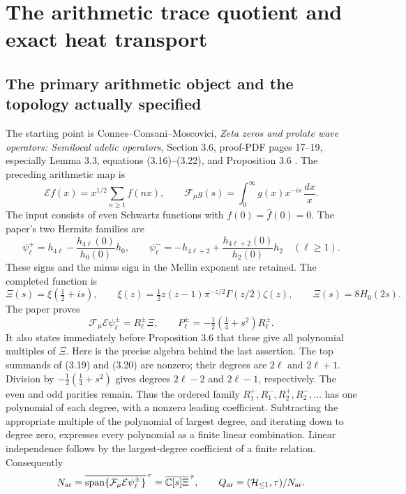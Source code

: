 \section{The arithmetic trace quotient and exact heat transport}
\label{sec:connes-complete-transport}

\subsection{The primary arithmetic object and the topology actually specified}
\label{sec:cq-source}
The starting point is Connes--Consani--Moscovici,
\emph{Zeta zeros and prolate wave operators: Semilocal adelic operators},
Section 3.6, proof-PDF pages 17--19, especially Lemma 3.3,
equations (3.16)--(3.22), and Proposition 3.6
\cite{ccmProlate2024}. The preceding arithmetic map is
\[
 \mathcal E f(x)=x^{1/2}\sum_{n\geq1}f(nx),\qquad
 \mathcal F_\mu g(s)=\int_0^\infty g(x)x^{-is}\,\frac{dx}{x}.
\]
The input consists of even Schwartz functions with
$f(0)=\widehat f(0)=0$. The paper's two Hermite families are
\[
 \psi_\ell^+=h_{4\ell}-\frac{h_{4\ell}(0)}{h_0(0)}h_0,
 \qquad
 \psi_\ell^-=-h_{4\ell+2}
       +\frac{h_{4\ell+2}(0)}{h_2(0)}h_2\quad(\ell\geq1).
\]
These signs and the minus sign in the Mellin exponent are retained.
The completed function is
\begin{equation}\label{eq:cq-Xi}
 \Xi(s)=\xi(\tfrac12+is),\qquad
 \xi(z)=\tfrac12z(z-1)\pi^{-z/2}\Gamma(z/2)\zeta(z),
 \qquad \Xi(s)=8H_0(2s).
\end{equation}
The paper proves
\begin{equation}\label{eq:cq-image}
 \mathcal F_\mu\mathcal E\psi_\ell^\pm=R_\ell^\pm\Xi,
 \qquad P_\ell^\pm=-\tfrac12(\tfrac14+s^2)R_\ell^\pm.
\end{equation}
It also states immediately before Proposition 3.6 that these give all
polynomial multiples of $\Xi$. Here is the precise algebra behind the
last assertion. The top summands of (3.19) and (3.20) are nonzero;
their degrees are $2\ell$ and $2\ell+1$. Division by
$-\tfrac12(\tfrac14+s^2)$ gives degrees $2\ell-2$ and
$2\ell-1$, respectively. The even and odd parities remain.
Thus the ordered family $R_1^+,R_1^-,R_2^+,R_2^-,\ldots$
has one polynomial of each degree, with a nonzero leading coefficient.
Subtracting the appropriate multiple of the polynomial of largest
degree, and iterating down to degree zero, expresses every polynomial
as a finite linear combination. Linear independence follows by the
largest-degree coefficient of a finite relation. Consequently
\begin{equation}\label{eq:cq-N}
 N_{\rm ar}=\overline{\operatorname{span}
 \{\mathcal F_\mu\mathcal E\psi_\ell^\pm\}}^{\,\tau}
 =\overline{\mathbb C[s]\Xi}^{\,\tau},\qquad
 Q_{\rm ar}=(\mathcal H_{\leq 1},\tau)/N_{\rm ar}.
\end{equation}

